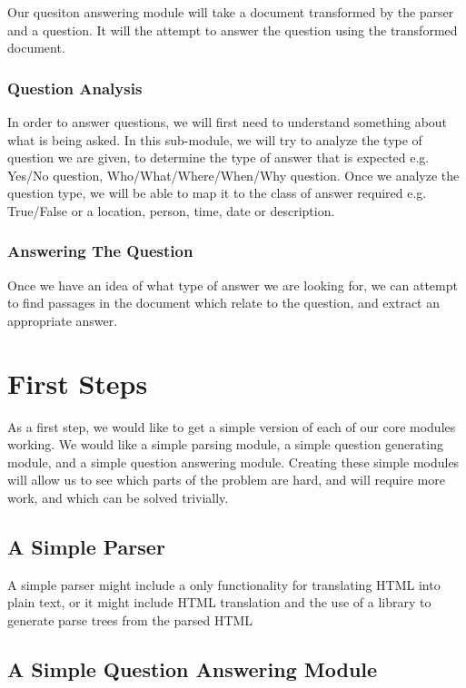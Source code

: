 \documentclass[12pt]{article}
\begin{document}
Our quesiton answering module will take a document transformed by the parser and a question. It will the attempt to answer the question using the transformed document.

\subsubsection{Question Analysis}

In order to answer questions, we will first need to understand something about what is being asked. In this sub-module, we will try to analyze the type of question we are given, to determine the type of answer that is expected e.g. Yes/No question, Who/What/Where/When/Why question. Once we analyze the question type, we will be able to map it to the class of answer required e.g. True/False or a location, person, time, date or description.

\subsubsection{Answering The Question}

Once we have an idea of what type of answer we are looking for, we can attempt to find passages in the document which relate to the question, and extract an appropriate answer.

\section{First Steps}


As a first step, we would like to get a simple version of each of our core modules working. We would like a simple parsing module, a simple question generating module, and a simple question answering module. Creating these simple modules will allow us to see which parts of the problem are hard, and will require more work, and which can be solved trivially. 

\subsection{A Simple Parser}

A simple parser might include a only functionality for translating HTML into plain text, or it might include HTML translation and the use of a library to generate parse trees from the parsed HTML

\subsection{A Simple Question Answering Module}
\end{document}
